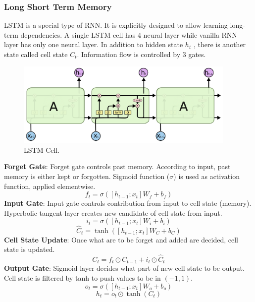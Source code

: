 \subsubsection{Long Short Term Memory}
LSTM is a special type of RNN. It is explicitly designed to allow learning long-term dependencies. A single LSTM cell has 4 neural layer while vanilla RNN layer has only one neural layer. In addition to hidden state $h_t$ , there is another state called cell state $C_t$. Information flow is controlled by 3 gates. \\
\begin{figure}
	\centering
	\includegraphics[width=0.95\textwidth]{figures/ml_theory/lstm/lstm_module.png}
	\caption{LSTM Cell.}
	\label{fig:lstm_cell}
\end{figure}
\textbf{Forget Gate}: Forget gate controls past memory. According to input, past memory is either kept or forgotten. Sigmoid function ($\sigma$) is used as activation function, applied elementwise. \\
\begin{equation}
\label{eqn:lstm_forget}
f_t = \sigma( [h_{t-1}; x_t] W_f + b_f) 
\end{equation}
\textbf{Input Gate}: Input gate controls contribution from input to cell state (memory). Hyperbolic tangent layer creates new candidate of cell state from input. \\
\begin{equation}
\label{eqn:lstm_inp}
i_t = \sigma( [h_{t-1}; x_t] W_i + b_{i}) 
\end{equation}
\begin{equation}
\label{eqn:lstm_cellstcand}
\hat{C}_t = \tanh( [h_{t-1}; x_t] W_C + b_C) 
\end{equation}
\textbf{Cell State Update}: Once what are to be forget and added are decided, cell state is updated. \\
\begin{equation}
\label{eqn:lstm_cellstupt}
C_t = f_t \odot C_{t-1} + i_t \odot \hat{C}_t
\end{equation}
\textbf{Output Gate}: Sigmoid layer decides what part of new cell state to be output. Cell state is filtered by tanh to push values to be in $(-1,1)$. \\
\begin{equation}
\label{eqn:lstm_out}
o_t = \sigma( [h_{t-1}; x_t] W_o + b_o) 
\end{equation}
\begin{equation}
h_t = o_t \odot \tanh(C_t)
\end{equation}

